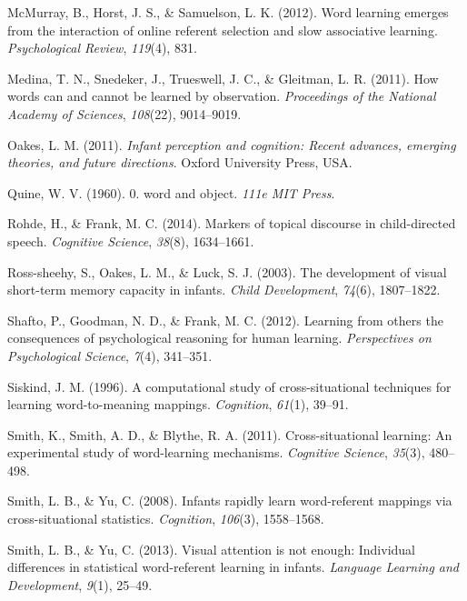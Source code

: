 \documentclass[authoryear, review]{elsarticle}
\begin{document}
\hypertarget{ref-mcmurray2012word}{}
McMurray, B., Horst, J. S., \& Samuelson, L. K. (2012). Word learning
emerges from the interaction of online referent selection and slow
associative learning. \emph{Psychological Review}, \emph{119}(4), 831.

\hypertarget{ref-medina2011words}{}
Medina, T. N., Snedeker, J., Trueswell, J. C., \& Gleitman, L. R.
(2011). How words can and cannot be learned by observation.
\emph{Proceedings of the National Academy of Sciences}, \emph{108}(22),
9014--9019.

\hypertarget{ref-oakes2011infant}{}
Oakes, L. M. (2011). \emph{Infant perception and cognition: Recent
advances, emerging theories, and future directions}. Oxford University
Press, USA.

\hypertarget{ref-quine19600}{}
Quine, W. V. (1960). 0. word and object. \emph{111e MIT Press}.

\hypertarget{ref-rohde2014markers}{}
Rohde, H., \& Frank, M. C. (2014). Markers of topical discourse in
child-directed speech. \emph{Cognitive Science}, \emph{38}(8),
1634--1661.

\hypertarget{ref-ross2003development}{}
Ross-sheehy, S., Oakes, L. M., \& Luck, S. J. (2003). The development of
visual short-term memory capacity in infants. \emph{Child Development},
\emph{74}(6), 1807--1822.

\hypertarget{ref-shafto2012learning}{}
Shafto, P., Goodman, N. D., \& Frank, M. C. (2012). Learning from others
the consequences of psychological reasoning for human learning.
\emph{Perspectives on Psychological Science}, \emph{7}(4), 341--351.

\hypertarget{ref-siskind1996computational}{}
Siskind, J. M. (1996). A computational study of cross-situational
techniques for learning word-to-meaning mappings. \emph{Cognition},
\emph{61}(1), 39--91.

\hypertarget{ref-smith2011cross}{}
Smith, K., Smith, A. D., \& Blythe, R. A. (2011). Cross-situational
learning: An experimental study of word-learning mechanisms.
\emph{Cognitive Science}, \emph{35}(3), 480--498.

\hypertarget{ref-smith2008infants}{}
Smith, L. B., \& Yu, C. (2008). Infants rapidly learn word-referent
mappings via cross-situational statistics. \emph{Cognition},
\emph{106}(3), 1558--1568.

\hypertarget{ref-smith2013visual}{}
Smith, L. B., \& Yu, C. (2013). Visual attention is not enough:
Individual differences in statistical word-referent learning in infants.
\emph{Language Learning and Development}, \emph{9}(1), 25--49.
\end{document}
